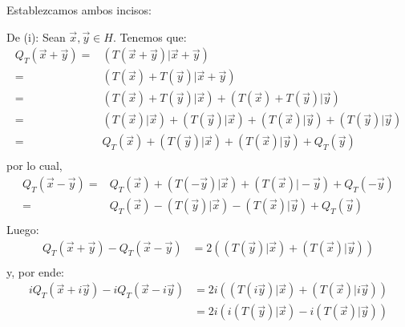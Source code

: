\documentclass[12pt]{report}
\newcounter{it}
\theoremstyle{largebreak}
\newcommand\pint[2]{\ensuremath{\left(#1\big|#2\right)}}
\begin{document}
    \begin{sol}
        Establezcamos ambos incisos:
        
        De (i): Sean $\vec{x},\vec{y}\in H$. Tenemos que:
        \begin{equation*}
            \begin{split}
                Q_T(\vec{x}+\vec{y})=&\pint{T(\vec{x}+\vec{y})}{\vec{x}+\vec{y}}\\
                =&\pint{T(\vec{x})+T(\vec{y})}{\vec{x}+\vec{y}}\\
                =&\pint{T(\vec{x})+T(\vec{y})}{\vec{x}}+\pint{T(\vec{x})+T(\vec{y})}{\vec{y}}\\
                =&\pint{T(\vec{x})}{\vec{x}}+\pint{T(\vec{y})}{\vec{x}}+\pint{T(\vec{x})}{\vec{y}}+\pint{T(\vec{y})}{\vec{y}}\\
                =&Q_T(\vec{x})+\pint{T(\vec{y})}{\vec{x}}+\pint{T(\vec{x})}{\vec{y}}+Q_T(\vec{y})\\
            \end{split}
        \end{equation*}
        por lo cual,
        \begin{equation*}
            \begin{split}
                Q_T(\vec{x}-\vec{y})=&Q_T(\vec{x})+\pint{T(-\vec{y})}{\vec{x}}+\pint{T(\vec{x})}{-\vec{y}}+Q_T(-\vec{y})\\
                =&Q_T(\vec{x})-\pint{T(\vec{y})}{\vec{x}}-\pint{T(\vec{x})}{\vec{y}}+Q_T(\vec{y})\\
            \end{split}
        \end{equation*}
        Luego:
        \begin{equation*}
            \begin{split}
                Q_T(\vec{x}+\vec{y})-Q_T(\vec{x}-\vec{y})&=2\left(\pint{T(\vec{y})}{\vec{x}}+\pint{T(\vec{x})}{\vec{y}}\right)\\
            \end{split}
        \end{equation*}
        y, por ende:
        \begin{equation*}
            \begin{split}
                iQ_T(\vec{x}+i\vec{y})-iQ_T(\vec{x}-i\vec{y})&=2i\left(\pint{T(i\vec{y})}{\vec{x}}+\pint{T(\vec{x})}{i\vec{y}}\right)\\
                &=2i\left(i\pint{T(\vec{y})}{\vec{x}}-i\pint{T(\vec{x})}{\vec{y}}\right)\\

\end{split}
\end{equation*}
\end{sol}
\end{document}
